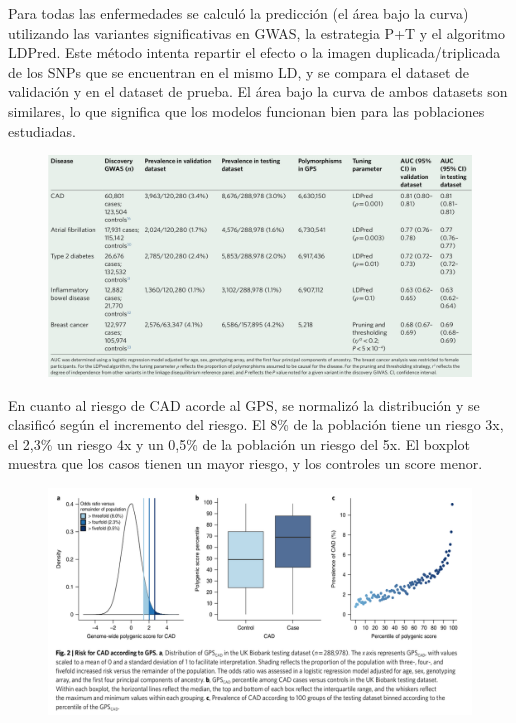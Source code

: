 Para todas las enfermedades se calculó la predicción (el área bajo la curva) utilizando las variantes significativas en GWAS, la estrategia P+T y el algoritmo LDPred. Este método intenta repartir el efecto o la imagen duplicada/triplicada de los SNPs que se encuentran en el mismo LD, y se compara el dataset de validación y en el dataset de prueba. El área bajo la curva de ambos datasets son similares, lo que significa que los modelos funcionan bien para las poblaciones estudiadas.

\begin{figure}[htbp]
\centering
\includegraphics[width = 0.8 \textwidth]{figs/Imagen6.png}
\end{figure}

\newpage
En cuanto al riesgo de CAD acorde al GPS, se normalizó la distribución y se clasificó según el incremento del riesgo. El 8\% de la población tiene un riesgo 3x, el 2,3\% un riesgo 4x y un 0,5\% de la población un riesgo del 5x. El boxplot muestra que los casos tienen un mayor riesgo, y los controles un score menor.

\begin{figure}[htbp]
\centering
\includegraphics[width = \textwidth]{figs/Imagen7.png}
\end{figure}

